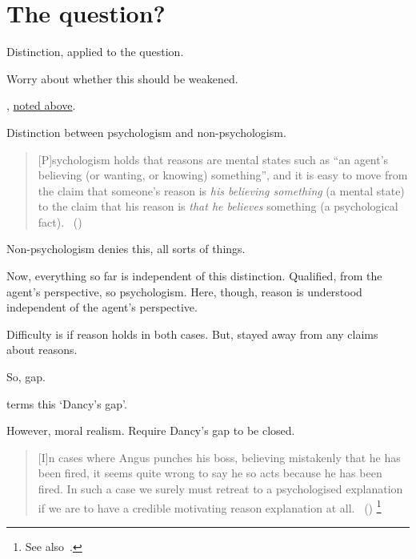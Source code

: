 \section{The question?}
\label{cha:zSpA:sec:ptivity-question}

\begin{note}
  Distinction, applied to the question.

  Worry about whether this should be weakened.
\end{note}

\begin{note}
  \citeauthor{Dancy:2000aa}, \hyperref[dancy-to-return]{noted above}.

  Distinction between psychologism and non-psychologism.

  \begin{quote}
    [P]sychologism holds that reasons are mental states such as “an agent’s believing (or wanting, or knowing) something”, and it is easy to move from the claim that someone’s reason is \emph{his believing something} (a mental state) to the claim that his reason is \emph{that he believes} something (a psychological fact).%
    \mbox{ }\hfill\mbox{(\citeauthor[\S3]{Alvarez:2017vr})}
  \end{quote}

  Non-psychologism denies this, all sorts of things.

  Now, everything so far is independent of this distinction.
  Qualified, from the agent's perspective, so psychologism.
  Here, though, reason is understood independent of the agent's perspective.

  Difficulty is if reason holds in both cases.
  But, stayed away from any claims about reasons.

  So, gap.

  \citeauthor{Hieronymi:2011aa} terms this `Dancy's gap'.


  However, moral realism.
  Require Dancy's gap to be closed.

  \begin{quote}
    [I]n cases where Angus punches his boss, believing mistakenly that he has been fired, it seems quite wrong to say he so acts because he has been fired.
    In such a case we surely must retreat to a psychologised explanation if we are to have a credible motivating reason explanation at all.%
    \mbox{ }\hfill\mbox{(\citeyear[\S6]{Lenman:2011wy})}%
    \footnote{
      See also~\textcite[\S2]{Alvarez:2017vr}.
    }
  \end{quote}


\end{note}
